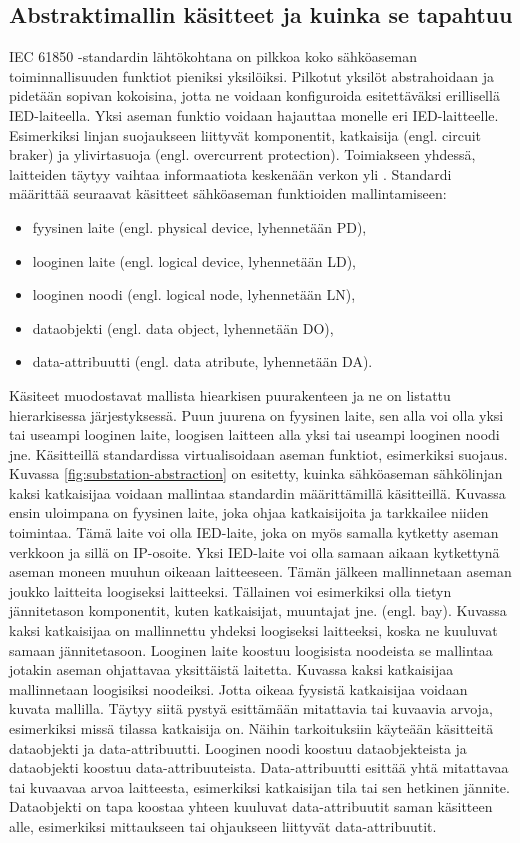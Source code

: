 \subsection{Abstraktimallin käsitteet ja kuinka se tapahtuu}
IEC 61850 -standardin lähtökohtana on pilkkoa koko sähköaseman toiminnallisuuden funktiot pieniksi yksilöiksi. Pilkotut yksilöt abstrahoidaan ja pidetään sopivan kokoisina, jotta ne voidaan konfiguroida esitettäväksi erillisellä IED-laiteella. Yksi aseman funktio voidaan hajauttaa monelle eri IED-laitteelle. Esimerkiksi linjan suojaukseen liittyvät komponentit, katkaisija (engl. circuit braker) ja ylivirtasuoja (engl. overcurrent protection). Toimiakseen yhdessä, laitteiden täytyy vaihtaa informaatiota keskenään verkon yli \cite[s.~31]{IEC61850-7-1}. Standardi määrittää seuraavat käsitteet sähköaseman funktioiden mallintamiseen:
\begin{itemize}
	\item fyysinen laite (engl. physical device, lyhennetään PD),
	\item looginen laite (engl. logical device, lyhennetään LD),
	\item looginen noodi (engl. logical node, lyhennetään LN),
	\item dataobjekti (engl. data object, lyhennetään DO),
	\item data-attribuutti (engl. data atribute, lyhennetään DA).
\end{itemize}
Käsiteet muodostavat mallista hiearkisen puurakenteen ja ne on listattu hierarkisessa järjestyksessä. Puun juurena on fyysinen laite, sen alla voi olla yksi tai useampi looginen laite, loogisen laitteen alla yksi tai useampi looginen noodi jne. Käsitteillä standardissa virtualisoidaan aseman funktiot, esimerkiksi suojaus. Kuvassa \ref{fig:substation-abstraction} on esitetty, kuinka sähköaseman sähkölinjan kaksi katkaisijaa voidaan mallintaa standardin määrittämillä käsitteillä. Kuvassa ensin uloimpana on fyysinen laite, joka ohjaa katkaisijoita ja tarkkailee niiden toimintaa. Tämä laite voi olla IED-laite, joka on myös samalla kytketty aseman verkkoon ja sillä on IP-osoite. Yksi IED-laite voi olla samaan aikaan kytkettynä aseman moneen muuhun oikeaan laitteeseen. Tämän jälkeen mallinnetaan aseman joukko laitteita loogiseksi laitteeksi. Tällainen voi esimerkiksi olla tietyn jännitetason komponentit, kuten katkaisijat, muuntajat jne. (engl. bay). Kuvassa kaksi katkaisijaa on mallinnettu yhdeksi loogiseksi laitteeksi, koska ne kuuluvat samaan jännitetasoon. Looginen laite koostuu loogisista noodeista se mallintaa jotakin aseman ohjattavaa yksittäistä laitetta. Kuvassa kaksi katkaisijaa mallinnetaan loogisiksi noodeiksi. Jotta oikeaa fyysistä katkaisijaa voidaan kuvata mallilla. Täytyy siitä pystyä esittämään mitattavia tai kuvaavia arvoja, esimerkiksi missä tilassa katkaisija on. Näihin tarkoituksiin käyteään käsitteitä dataobjekti ja data-attribuutti. Looginen noodi koostuu dataobjekteista ja dataobjekti koostuu data-attribuuteista. Data-attribuutti esittää yhtä mitattavaa tai kuvaavaa arvoa laitteesta, esimerkiksi katkaisijan tila tai sen hetkinen jännite. Dataobjekti on tapa koostaa yhteen kuuluvat data-attribuutit saman käsitteen alle, esimerkiksi mittaukseen tai ohjaukseen liittyvät data-attribuutit. \cite[s.~2]{Camachi2017} \cite[s.~24]{IEC61850-1}

